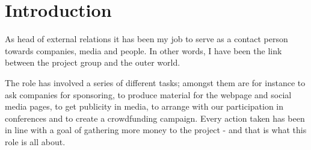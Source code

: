 \section{Introduction}\label{sec:introduction}
As head of external relations it has been my job to serve as a contact person towards companies, media and people. In other words, I have been the link between the project group and the outer world. 

The role has involved a series of different tasks; amongst them are for instance to ask companies for sponsoring, to produce material for the webpage and social media pages, to get publicity in media, to arrange with our participation in conferences and to create a crowdfunding campaign. Every action taken has been in line with a goal of gathering more money to the project - and that is what this role is all about.
